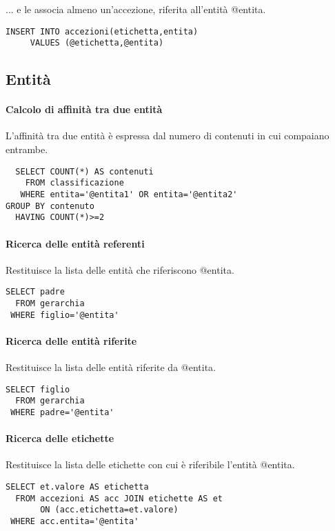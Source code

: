 ... e le associa almeno un'accezione, riferita all'entità \textsf{@entita}.

\begin{verbatim}
INSERT INTO accezioni(etichetta,entita)
     VALUES (@etichetta,@entita)
\end{verbatim}
	
\subsection*{Entità}
	
\paragraph{Calcolo di affinità tra due entità}
L'affinità tra due entità è espressa dal numero di contenuti in cui compaiano entrambe.
\begin{verbatim}
  SELECT COUNT(*) AS contenuti
    FROM classificazione
   WHERE entita='@entita1' OR entita='@entita2'
GROUP BY contenuto
  HAVING COUNT(*)>=2
\end{verbatim}

\paragraph{Ricerca delle entità referenti}
Restituisce la lista delle entità che riferiscono \textsf{@entita}.
\begin{verbatim}
SELECT padre
  FROM gerarchia
 WHERE figlio='@entita'
\end{verbatim}

\paragraph{Ricerca delle entità riferite}
Restituisce la lista delle entità riferite da \textsf{@entita}.
\begin{verbatim}
SELECT figlio
  FROM gerarchia
 WHERE padre='@entita'
\end{verbatim}

\paragraph{Ricerca delle etichette}
Restituisce la lista delle etichette con cui è riferibile l'entità \textsf{@entita}.
\begin{verbatim}
SELECT et.valore AS etichetta
  FROM accezioni AS acc JOIN etichette AS et
       ON (acc.etichetta=et.valore)
 WHERE acc.entita='@entita'
\end{verbatim}

